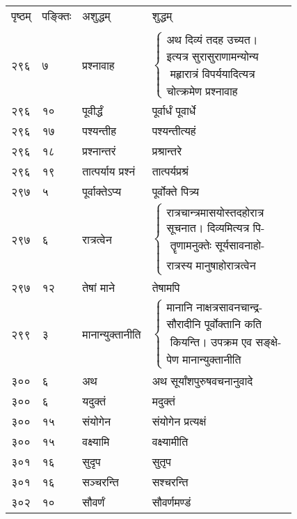 \documentclass[11pt, openany]{book}
\begin{document}
\begin{longtable}{p{1cm} p{1.5cm} p{4cm} p{4cm}}
पृष्ठम् & पङ्क्तिः & अशुद्धम् & शुद्धम् \\
\vspace{2mm}\\

२९६ & ७ & प्रश्नावाह & $\begin{cases}\mbox{अथ दिव्यं तदह उच्यत।}\\
\mbox{इत्यत्र सुरासुराणामन्योन्य}\\
\mbox{ महृारात्रं विपर्ययादित्यत्र}\\
\mbox{चोत्क्रमेण प्रश्नावाह }\end{cases}$\\

 २९६ & १० & पूवीर्द्धं & पूर्वार्धं पूवार्धे \\

 २९६ & १७ & पश्यन्तीह & पश्यन्तीत्यहं \\

 २९६ & १८ & प्रश्नान्तरं & प्रश्रान्तरे \\

 २९६ & १९ & तात्पर्याय प्रश्नं & तात्पर्यप्रश्रं \\

 २९७ & ५ & पूर्वाक्तेऽप्य & पूर्वोक्ते पित्र्य \\

२९७ & ६ & रात्रत्वेन & $\begin{cases}\mbox{रात्रचान्त्रमासयोस्तदहोरात्र}\\
\mbox{सूचनात। दिव्यमित्यत्र पि-}\\
\mbox{ तॄणामनुक्तेः सूर्यसावनाहो-}\\
\mbox{रात्रस्य मानुषाहोरात्रत्वेन }\end{cases}$\\

 २९७ & १२ & तेषां माने & तेषामपि \\

२९९ & ३ & मानान्युक्तानीति & $\begin{cases}\mbox{मानानि नाक्षत्रसावनचान्द्र-}\\
\mbox{सौरादीनि पूर्वोक्तानि कति}\\
\mbox{  कियन्ति। उपक्रम एव सङ्क्षे-}\\
\mbox{पेण मानान्युक्तानीति }\end{cases}$\\

 ३०० & ६ & अथ & अथ सूर्यांशपुरुषवचनानुवादे \\

 ३०० & ६ & यदुक्तं & मदुक्तं \\

 ३०० & १५ & संयोगेन & संयोगेन प्रत्यक्षं \\

 ३०० & १५ & वक्ष्यामि & वक्ष्यामीति \\

 ३०१ & १६ & सुदृप & सुतृप \\

 ३०१ & १६ & सञ्चरन्ति & सश्चरन्ति \\

 ३०२ & १० & सौवर्णं &  सौवर्णमण्डं\\
\end{longtable}
\end{document}

